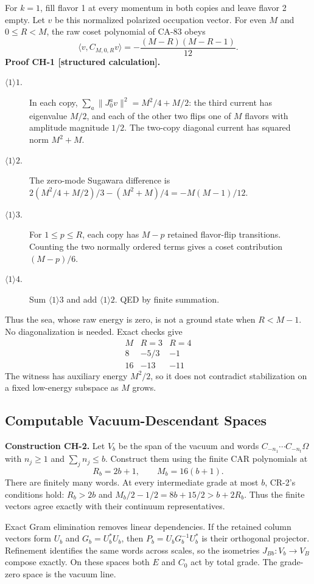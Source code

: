 For $k=1$, fill flavor 1 at every momentum in both copies and leave flavor 2
empty. Let $v$ be this normalized polarized occupation vector. For even $M$
and $0\le R<M$, the raw coset polynomial of CA-83 obeys
\[
 \langle v,C_{M,0,R}v\rangle=-\frac{(M-R)(M-R-1)}{12}.
\]
\textbf{Proof CH-1 [structured calculation].}
\begin{description}
\item[$\langle1\rangle1$.] In each copy,
$\sum_a\|J_0^a v\|^2=M^2/4+M/2$: the third current has eigenvalue
$M/2$, and each of the other two flips one of $M$ flavors with amplitude
magnitude $1/2$. The two-copy diagonal current has squared norm $M^2+M$.
\item[$\langle1\rangle2$.] The zero-mode Sugawara difference is
$2(M^2/4+M/2)/3-(M^2+M)/4=-M(M-1)/12$.
\item[$\langle1\rangle3$.] For $1\le p\le R$, each copy has $M-p$
retained flavor-flip transitions. Counting the two normally ordered terms
gives a coset contribution $(M-p)/6$.
\item[$\langle1\rangle4$.] Sum $\langle1\rangle3$ and add
$\langle1\rangle2$. QED by finite summation.
\end{description}
Thus the sea, whose raw energy is zero, is not a ground state when $R<M-1$.
No diagonalization is needed. Exact checks give
\[
\begin{array}{c|cc}
M & R=3 & R=4\\\hline
8&-5/3&-1\\16&-13&-11
\end{array}
\]
The witness has auxiliary energy $M^2/2$, so it does not contradict
stabilization on a fixed low-energy subspace as $M$ grows.

\subsection{Computable Vacuum-Descendant Spaces}

\textbf{Construction CH-2.} Let $V_b$ be the span of the vacuum and words
$C_{-n_1}\cdots C_{-n_t}\Omega$ with $n_j\ge1$ and $\sum_jn_j\le b$.
Construct them using the finite CAR polynomials at
\[
 R_b=2b+1,\qquad M_b=16(b+1).
\]
There are finitely many words. At every intermediate grade at most $b$,
CR-2's conditions hold: $R_b>2b$ and
$M_b/2-1/2=8b+15/2>b+2R_b$. Thus the finite vectors agree exactly
with their continuum representatives.

Exact Gram elimination removes linear dependencies. If the retained column
vectors form $U_b$ and $G_b=U_b^*U_b$, then
$P_b=U_bG_b^{-1}U_b^*$ is their orthogonal projector. Refinement identifies
the same words across scales, so the isometries $J_{Bb}:V_b\to V_B$
compose exactly. On these spaces both $E$ and $C_0$ act by total grade.
The grade-zero space is the vacuum line.

